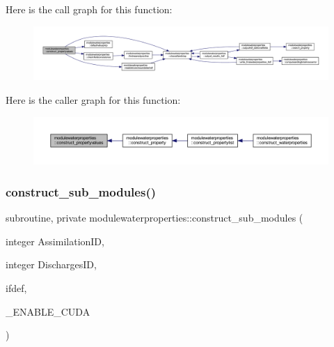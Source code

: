 Here is the call graph for this function\+:\nopagebreak
\begin{figure}[H]
\begin{center}
\leavevmode
\includegraphics[width=350pt]{namespacemodulewaterproperties_aa646aa8763204437f6ad88ddbd01c560_cgraph}
\end{center}
\end{figure}
Here is the caller graph for this function\+:\nopagebreak
\begin{figure}[H]
\begin{center}
\leavevmode
\includegraphics[width=350pt]{namespacemodulewaterproperties_aa646aa8763204437f6ad88ddbd01c560_icgraph}
\end{center}
\end{figure}
\mbox{\label{namespacemodulewaterproperties_aef459b24af9c748df5b5fb96dc4292bb}} 
\subsubsection{\texorpdfstring{construct\+\_\+sub\+\_\+modules()}{construct\_sub\_modules()}}
{\footnotesize\ttfamily subroutine, private modulewaterproperties\+::construct\+\_\+sub\+\_\+modules (\begin{DoxyParamCaption}\item[{integer}]{Assimilation\+ID,  }\item[{integer}]{Discharges\+ID,  }\item[{}]{ifdef,  }\item[{}]{\+\_\+\+E\+N\+A\+B\+L\+E\+\_\+\+C\+U\+DA }\end{DoxyParamCaption})\hspace{0.3cm}{\ttfamily [private]}}

